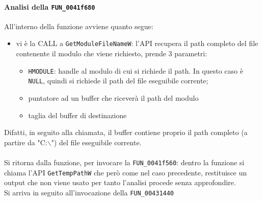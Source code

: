 \documentclass[12pt]{extarticle}
\begin{document}
\paragraph{Analisi della \texttt{FUN\_0041f680}}
All'interno della funzione avviene quanto segue:
\begin{itemize}
    \item vi è la CALL a \texttt{GetModuleFileNameW}: l'API  recupera il path completo del file contenente il modulo che viene richiesto,  prende 3 parametri:
    \begin{itemize}
        \item \texttt{HMODULE}: handle al modulo di cui si richiede il path. In questo caso è \texttt{NULL}, quindi si richiede il path del file eseguibile corrente;
        \item puntatore ad un buffer che riceverà il path del modulo
        \item taglia del buffer di destinazione
    \end{itemize}
\end{itemize}
Difatti, in seguito alla chiamata, il buffer contiene proprio il path completo (a partire da "C:$\backslash$") del file eseguibile corrente.\\\\Si ritorna dalla funzione, per invocare la \texttt{FUN\_0041f560}: dentro la funzione si chiama l'API \texttt{GetTempPathW} che però come nel caso precedente, restituisce un output che non viene usato per tanto l'analisi procede senza approfondire.\\Si arriva in seguito all'invocazione della \texttt{FUN\_00431440}
\end{document}
